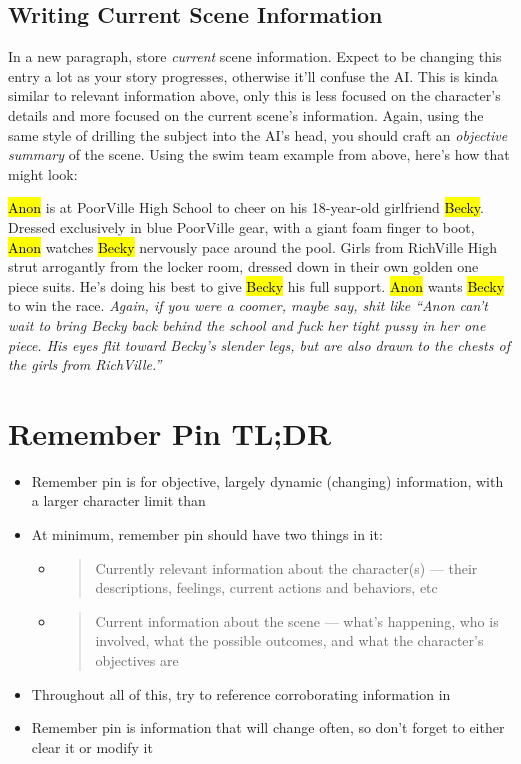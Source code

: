 \documentclass[Avsfag-main.tex]{subfiles}
\begin{document}
\subsection{Writing Current Scene Information}
\label{subsec:currect info}

In a new paragraph, store \emph{current} scene information.
Expect to be changing this entry a lot as your story progresses, otherwise it'll confuse the AI.
This is kinda similar to relevant information above, only this is less focused on the character's details and more focused on the current scene's information.
Again, using the same style of drilling the subject into the AI's head, you should craft an \emph{objective summary} of the scene.
Using the swim team example from above, here's how that might look:

\begin{/rm}
\hl{Anon} is at PoorVille High School to cheer on his 18-year-old girlfriend \hl{Becky}.
Dressed exclusively in blue PoorVille gear, with a giant foam finger to boot, \hl{Anon} watches \hl{Becky} nervously pace around the pool.
Girls from RichVille High strut arrogantly from the locker room, dressed down in their own golden one piece suits.
He's doing his best to give \hl{Becky} his full support.
\hl{Anon} wants \hl{Becky} to win the race.
\tcblower
\em \small Again, if you were a coomer, maybe say, shit like ``Anon can't wait to bring Becky back behind the school and fuck her tight pussy in her one piece.
His eyes flit toward Becky's slender legs, but are also drawn to the chests of the girls from RichVille.''
\end{/rm}

\section{Remember Pin TL;DR}
\label{sec:rm tl;dr}

\begin{itemize}
\item
  Remember pin is for objective, largely dynamic (changing) information, with a larger character limit than \wi
\item
  At minimum, remember pin should have two things in it:

  \begin{itemize}
  \item
    \begin{quote}
    Currently relevant information about the character(s) --- their descriptions, feelings, current actions and behaviors, etc
    \end{quote}
  \item
    \begin{quote}
    Current information about the scene --- what's happening, who is involved, what the possible outcomes, and what the character's objectives are
    \end{quote}
  \end{itemize}
\item
  Throughout all of this, try to reference corroborating information in \wi
\item
  Remember pin is information that will change often, so don't forget to either clear it or modify it
\end{itemize}
\end{document}
